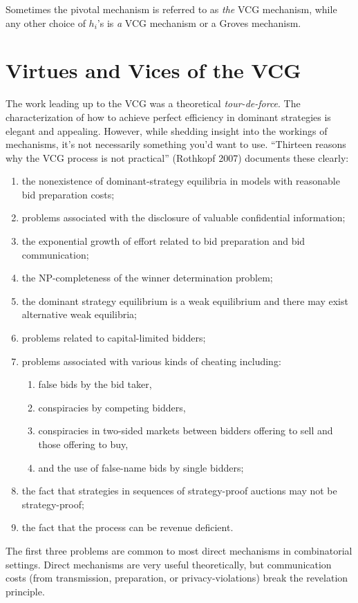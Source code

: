 \documentclass[10pt]{article}
\begin{document}
\begin{spacing}{1.0}
Sometimes the pivotal mechanism is referred to as \emph{the} VCG mechanism,
while any other choice of $h_i$'s is \emph{a} VCG mechanism or a Groves
mechanism.

\section{Virtues and Vices of the VCG}
\label{sec:virtues-vcg}

The work leading up to the VCG was a theoretical
\emph{tour-de-force}. The characterization of how to achieve
perfect efficiency in dominant strategies is elegant and
appealing. However, while shedding insight into the workings of mechanisms,
it's not necessarily something you'd want to use. ``Thirteen reasons why the
VCG process is not practical'' (Rothkopf 2007) documents these clearly:
\begin{enumerate}
\item the nonexistence of dominant-strategy equilibria in models with reasonable bid preparation costs;
\item problems associated with the disclosure of valuable confidential
  information;
\item the exponential growth of effort related to bid preparation and bid
  communication;
\item the NP-completeness of the winner determination problem;
\item the dominant strategy equilibrium is a weak equilibrium and there may
  exist alternative weak equilibria;
\item problems related to capital-limited bidders;
\item problems associated with various kinds of cheating
  including:
  \begin{enumerate}
  \item false bids by the bid taker,
  \item conspiracies by competing bidders,
  \item conspiracies in two-sided markets between bidders offering
    to sell and those offering to buy,
  \item  and the use of false-name bids by single bidders;
  \end{enumerate}
\item the fact that strategies in sequences of strategy-proof auctions may
  not be strategy-proof;
\item the fact that the process can be revenue deficient.
\end{enumerate}
The first three problems are common to most direct mechanisms in
combinatorial settings. Direct mechanisms are very useful theoretically,
but communication costs (from transmission, preparation, or
privacy-violations) break the revelation principle.


\end{spacing}
\end{document}

